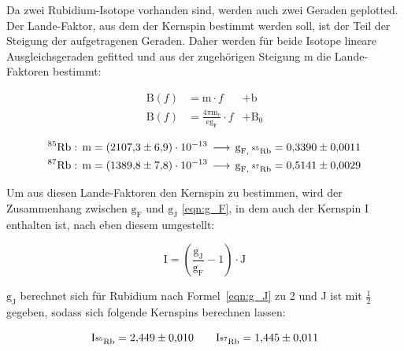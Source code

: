         \noindent
        
        
        
        Da zwei Rubidium-Isotope vorhanden sind, werden auch zwei Geraden geplotted. Der Lande-Faktor, aus dem der Kernspin bestimmt werden soll, ist der Teil der Steigung der aufgetragenen Geraden. Daher 
        werden für beide Isotope lineare Ausgleichsgeraden gefitted und aus der zugehörigen Steigung m die Lande-Faktoren bestimmt:

        \begin{align*}
            \text{B}(f) &= \text{m} \cdot f &+ \text{b}   \\
            \text{B}(f) &= \frac{4 \pi \text{m}_{\text{e}}}{\text{e} \text{g}_{\text{F}}} \cdot f &+ \text{B}_0 
        \end{align*}

        \begin{align*}
            \text{${}^{85}$Rb} &: \, \text{m} = \num{2107.3\pm6.9 e-13} \, \longrightarrow \, \text{g}_{\text{F, ${}^{85}$Rb}} = \num{0.3390 +- 0.0011} \\
            \text{${}^{87}$Rb} &: \, \text{m} = \num{1389.8\pm7.8 e-13} \, \longrightarrow \, \text{g}_{\text{F, ${}^{87}$Rb}} = \num{0.5141 +- 0.0029} 
        \end{align*}

        \noindent

        Um aus diesen Lande-Faktoren den Kernspin zu bestimmen, wird der Zusammenhang zwischen $\text{g}_{\text{F}}$ und $\text{g}_{\text{J}}$ \ref{eqn:g_F}, in dem auch der Kernspin I enthalten ist, nach 
        eben diesem umgestellt:
        
        \begin{equation*}
            \text{I} = \left( \frac{\text{g}_{\text{J}}}{\text{g}_{\text{F}}} - 1 \right) \cdot \text{J}
        \end{equation*}

        $\text{g}_{\text{J}}$ berechnet sich für Rubidium nach Formel~\ref{eqn:g_J} zu 2 und J ist mit $\frac{1}{2}$ gegeben, sodass sich folgende Kernspins berechnen lassen:

        \begin{equation*}
            \text{I}_{\text{${}^{85}$Rb}} = \num{2.449 +- 0.010} \qquad \text{I}_{\text{${}^{87}$Rb}} = \num{1.445 +- 0.011}
        \end{equation*}

        


